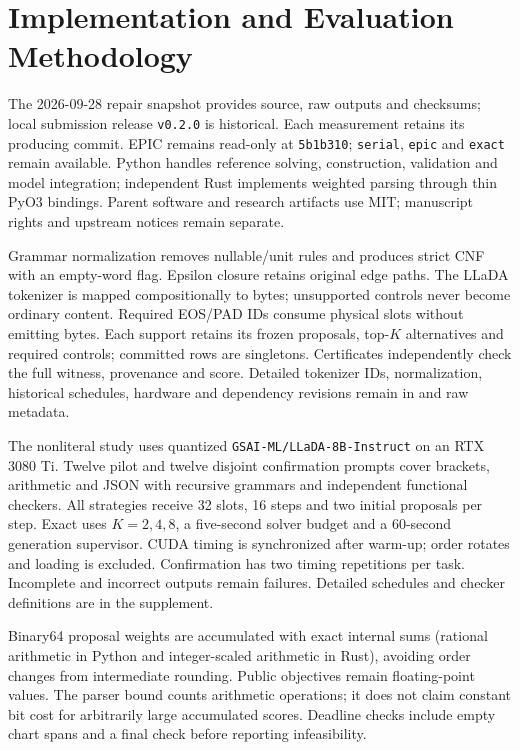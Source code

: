 \section{Implementation and Evaluation Methodology}
\label{sec:metodologia}

The 2026-09-28 repair snapshot provides source, raw outputs and checksums; local submission release \texttt{v0.2.0} is historical. Each measurement retains its producing commit. EPIC remains read-only at \texttt{5b1b310}; \texttt{serial}, \texttt{epic} and \texttt{exact} remain available. Python handles reference solving, construction, validation and model integration; independent Rust implements weighted parsing through thin PyO3 bindings. Parent software and research artifacts use MIT; manuscript rights and upstream notices remain separate.

Grammar normalization removes nullable/unit rules and produces strict CNF with an empty-word flag. Epsilon closure retains original edge paths. The LLaDA tokenizer is mapped compositionally to bytes; unsupported controls never become ordinary content. Required EOS/PAD IDs consume physical slots without emitting bytes. Each support retains its frozen proposals, top-$K$ alternatives and required controls; committed rows are singletons. Certificates independently check the full witness, provenance and score. Detailed tokenizer IDs, normalization, historical schedules, hardware and dependency revisions remain in  and raw metadata.

The nonliteral study uses quantized \texttt{GSAI-ML/LLaDA-8B-Instruct} on an RTX 3080 Ti. Twelve pilot and twelve disjoint confirmation prompts cover brackets, arithmetic and JSON with recursive grammars and independent functional checkers. All strategies receive 32 slots, 16 steps and two initial proposals per step. Exact uses $K=2,4,8$, a five-second solver budget and a 60-second generation supervisor. CUDA timing is synchronized after warm-up; order rotates and loading is excluded. Confirmation has two timing repetitions per task. Incomplete and incorrect outputs remain failures. Detailed schedules and checker definitions are in the supplement.

Binary64 proposal weights are accumulated with exact internal sums (rational arithmetic in Python and integer-scaled arithmetic in Rust), avoiding order changes from intermediate rounding. Public objectives remain floating-point values. The parser bound counts arithmetic operations; it does not claim constant bit cost for arbitrarily large accumulated scores. Deadline checks include empty chart spans and a final check before reporting infeasibility.

